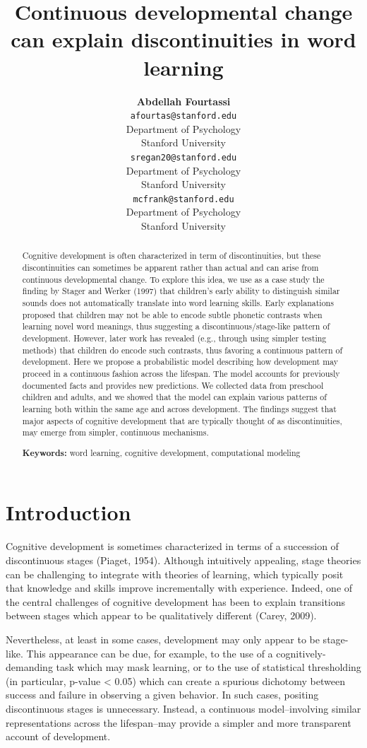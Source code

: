 \documentclass[10pt, letterpaper]{article}
\title{Continuous developmental change can explain discontinuities in word
learning}
\author{{\large \bf Abdellah Fourtassi} \\ \texttt{afourtas@stanford.edu} \\ Department of Psychology \\ Stanford University \And {\large \bf Sophie Regan} \\ \texttt{sregan20@stanford.edu} \\ Department of Psychology \\ Stanford University \And {\large \bf Michael C. Frank} \\ \texttt{mcfrank@stanford.edu} \\ Department of Psychology \\ Stanford University}
\begin{document}
\maketitle

\begin{abstract}
Cognitive development is often characterized in term of discontinuities,
but these discontinuities can sometimes be apparent rather than actual
and can arise from continuous developmental change. To explore this
idea, we use as a case study the finding by Stager and Werker (1997)
that children's early ability to distinguish similar sounds does not
automatically translate into word learning skills. Early explanations
proposed that children may not be able to encode subtle phonetic
contrasts when learning novel word meanings, thus suggesting a
discontinuous/stage-like pattern of development. However, later work has
revealed (e.g., through using simpler testing methods) that children do
encode such contrasts, thus favoring a continuous pattern of
development. Here we propose a probabilistic model describing how
development may proceed in a continuous fashion across the lifespan. The
model accounts for previously documented facts and provides new
predictions. We collected data from preschool children and adults, and
we showed that the model can explain various patterns of learning both
within the same age and across development. The findings suggest that
major aspects of cognitive development that are typically thought of as
discontinuities, may emerge from simpler, continuous mechanisms.

\textbf{Keywords:}
word learning, cognitive development, computational modeling
\end{abstract}

\section{Introduction}\label{introduction}

Cognitive development is sometimes characterized in terms of a
succession of discontinuous stages (Piaget, 1954). Although intuitively
appealing, stage theories can be challenging to integrate with theories
of learning, which typically posit that knowledge and skills improve
incrementally with experience. Indeed, one of the central challenges of
cognitive development has been to explain transitions between stages
which appear to be qualitatively different (Carey, 2009).

Nevertheless, at least in some cases, development may only appear to be
stage-like. This appearance can be due, for example, to the use of a
cognitively-demanding task which may mask learning, or to the use of
statistical thresholding (in particular, p-value \textless{} 0.05) which
can create a spurious dichotomy between success and failure in observing
a given behavior. In such cases, positing discontinuous stages is
unnecessary. Instead, a continuous model--involving similar
representations across the lifespan--may provide a simpler and more
transparent account of development.
\end{document}
